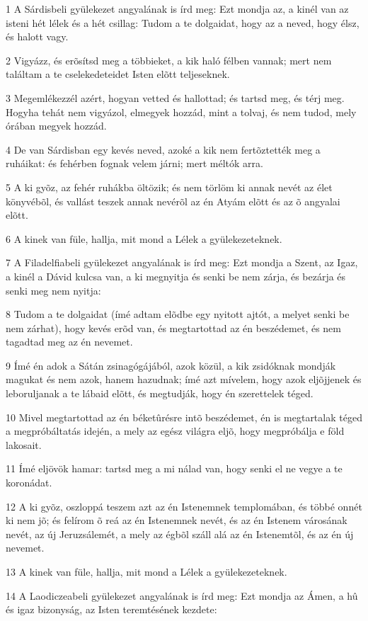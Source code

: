 \par 1 A Sárdisbeli gyülekezet angyalának is írd meg: Ezt mondja az, a kinél van az isteni hét lélek és a hét csillag: Tudom a te dolgaidat, hogy az a neved, hogy élsz, és halott vagy.
\par 2 Vigyázz, és erõsítsd meg a többieket, a kik haló félben vannak; mert nem találtam a te cselekedeteidet Isten elõtt teljeseknek.
\par 3 Megemlékezzél azért, hogyan vetted és hallottad; és tartsd meg, és térj meg. Hogyha tehát nem vigyázol, elmegyek hozzád, mint a tolvaj, és nem tudod, mely órában megyek hozzád.
\par 4 De van Sárdisban egy kevés neved, azoké a kik nem fertõztették meg a ruháikat: és fehérben fognak velem járni; mert méltók arra.
\par 5 A ki gyõz, az fehér ruhákba öltözik; és nem törlöm ki annak nevét az élet könyvébõl, és vallást teszek annak  nevérõl az én Atyám elõtt és az õ angyalai elõtt.
\par 6 A kinek van füle, hallja, mit mond a Lélek a gyülekezeteknek.
\par 7 A Filadelfiabeli gyülekezet angyalának is írd meg: Ezt mondja a Szent, az Igaz, a kinél a Dávid kulcsa van, a ki megnyitja és senki be nem zárja, és bezárja és senki meg nem nyitja:
\par 8 Tudom a te dolgaidat (ímé adtam elõdbe egy nyitott ajtót, a melyet senki be nem zárhat), hogy kevés erõd van, és megtartottad az én beszédemet, és nem tagadtad meg az én nevemet.
\par 9 Ímé én adok a Sátán zsinagógájából, azok közül, a kik zsidóknak mondják magukat és nem azok, hanem hazudnak; ímé azt mívelem, hogy azok eljõjjenek és leboruljanak a te lábaid elõtt, és megtudják, hogy én szerettelek téged.
\par 10 Mivel megtartottad az én béketûrésre intõ beszédemet, én is megtartalak téged a megpróbáltatás idején, a mely az egész világra eljõ, hogy megpróbálja e föld lakosait.
\par 11 Ímé eljövök hamar: tartsd meg a mi nálad van, hogy senki el ne vegye a te koronádat.
\par 12 A ki gyõz, oszloppá teszem azt az én Istenemnek templomában, és többé onnét ki nem jõ; és felírom õ reá az én Istenemnek nevét, és az én Istenem városának nevét, az új Jeruzsálemét,  a mely az égbõl száll alá az én Istenemtõl, és az én új nevemet.
\par 13 A kinek van füle, hallja, mit mond a Lélek a gyülekezeteknek.
\par 14 A Laodiczeabeli gyülekezet angyalának is írd meg: Ezt mondja az Ámen, a hû és igaz bizonyság, az Isten teremtésének  kezdete:

